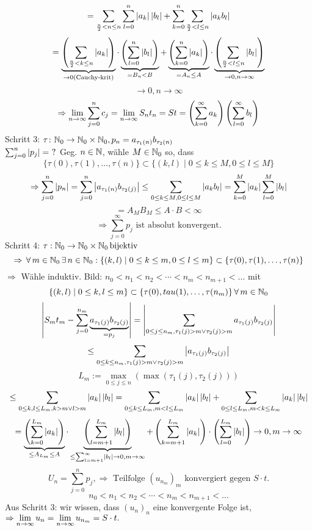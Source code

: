 \documentclass[../ana1.tex]{subfiles}
\begin{document}
\begin{bew}
    \[ = \sum_{\frac{n}{2} < n \leq n} \sum_{l=0}^n \left|a_k\right|\left|b_l\right| + \sum_{k=0}^n \sum_{\frac{n}{2} < l \leq n} \left|a_k b_l\right| \]
    \[ = \underbrace{\left( \sum_{\frac{n}{2} < k \leq n} \left|a_k\right| \right)}_{\rightarrow 0 \text{(Cauchy-krit)}} \cdot \underbrace{\left( \sum_{l=0}^n \left|b_l\right| \right)}_{=B_n < B} + \underbrace{\left( \sum_{k=0}^n \left|a_k\right| \right)}_{=A_n \leq A} \cdot \underbrace{ \left( \sum_{\frac{n}{2} < l \leq n} \left|b_l\right| \right) }_{\rightarrow 0, n\rightarrow\infty} \]
    \[ \rightarrow 0, n\rightarrow\infty \]
    \[ \Rightarrow \lim\limits_{n\rightarrow\infty} \sum_{j=0}^n c_j = \lim\limits_{n\rightarrow\infty} S_n t_n = S t = \left( \sum_{k=0}^\infty a_k \right) \left( \sum_{l=0}^\infty b_l \right) \]
    Schritt 3: \( \tau \colon \mathbb{N}_0 \rightarrow \mathbb{N}_0 \times \mathbb{N}_0, p_n = a_{\tau_1(n)} b_{\tau_2(n)} \) \\
    \( \sum_{j=0}^n \left|p_j\right| = \ ? \)
    Geg. \(n\in\mathbb{N} \), wähle \( M\in\mathbb{N}_0 \) so, dass 
    \[ \{ \tau(0), \tau(1), \ldots, \tau(n) \} \subset \{ (k,l) \; \vert \; 0 \leq k \leq M, 0 \leq l \leq M \} \]
    \[ \Rightarrow \sum_{j=0}^n \left|p_n\right| = \sum_{j=0}^n \left|a_{\tau_1(n)} b_{\tau_2(j)}\right| \leq \sum_{0\leq k\leq M, 0 \leq l \leq M} \left|a_k b_l\right| = \sum_{k=0}^M \left|a_k\right| \sum_{l=0}^M \left|b_l\right| \] 
    \[ = A_M B_M \leq A \cdot B < \infty \]
    \[ \Rightarrow \sum_{j=0}^\infty p_j \text{ ist absolut konvergent.} \]
    Schritt 4: \( \tau : \mathbb{N}_0 \rightarrow \mathbb{N}_0 \times \mathbb{N}_0 \operatorname{bijektiv} \)
    \[ \Rightarrow \, \forall \, m\in\mathbb{N}_0 \, \exists \, n\in\mathbb{N}_0 : \{ (k,l) \; \vert \; 0\leq k\leq m, 0\leq l\leq m \} \subset \{ \tau(0), \tau(1), \ldots, \tau(n) \} \]
    \( \Rightarrow \) Wähle induktiv. 
    Bild: 
    \( n_0 < n_1 < n_2 < \cdots < n_m < n_{m+1} < \ldots \) mit 
    \[ \{ (k,l) \; \vert \; 0 \leq k, l \leq m \} \subset \{ \tau(0), tau(1), \ldots , \tau(n_m) \} \, \forall \, m\in\mathbb{N}_0 \]
    \[ \left| S_m t_m - \sum_{j=0}^{n_m} \underbrace{ a_{\tau_1(j)} b_{\tau_2(j)} }_{=p_j} \right| = \left| \sum_{0\leq j\leq n_m, \tau_1(j) > m \vee \tau_2(j) > m} a_{\tau_1(j)} b_{\tau_2(j)} \right| \]
    \[ \leq \sum_{0\leq k \leq n_m, \tau_1(j) > m \vee \tau_2(j) > m} \left|a_{\tau_1(j)} b_{\tau_2(j)}\right| \]
    \[ L_m := \underset{0\leq j\leq n}{\max}(\max( \tau_1(j), \tau_2(j) ) ) \]
    \[ \leq \sum_{0\leq k, l\leq L_m, k > m \vee l > m} \left|a_k\right| \left|b_l\right| = \sum_{0\leq k\leq L_m, m<l\leq L_m} \left|a_k\right|\left|b_l\right| + \sum_{0\leq l \leq L_m, m<k\leq L_m} \left|a_k\right|\left|b_l\right| \]
    \[ = \underbrace{\left( \sum_{k=0}^{L_m} \left|a_k\right| \right)}_{\leq A_{L_m} \leq A} \cdot \underbrace{\left( \sum_{l=m+1}^{L_m} \left|b_l\right| \right)}_{\leq \sum_{l=m+1}^\infty \left|b_l\right| \rightarrow 0, m\rightarrow \infty} + \left( \sum_{k=m+1}^{L_m} \left|a_k\right| \right) \cdot \left( \sum_{l=0}^{L_m} \left|b_l\right| \right) \rightarrow 0, m\rightarrow\infty \]
    \[ U_n = \sum_{j=0}^n p_j, \Rightarrow \text{ Teilfolge } {(u_{n_m})}_m \text{ konvergiert gegen } S \cdot t. \]
    \[ n_0 < n_1 < n_2 < \cdots < n_m < n_{m+1} < \dots \]
    Aus Schritt 3: wir wissen, dass \( (u_n)_n \) eine konvergente Folge ist, \( \Rightarrow \lim\limits_{n\rightarrow\infty} u_n = \lim\limits_{n\rightarrow\infty} u_{n_m} = S \cdot t. \)
\end{bew}
\end{document}
